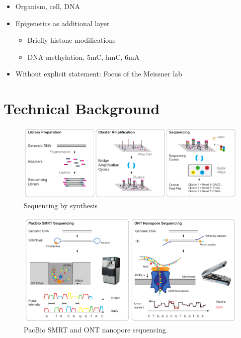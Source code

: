 \begin{itemize}
    \item Organism, cell, DNA
    \item Epigenetics as additional layer
    \begin{itemize}
        \item Briefly histone modifications
        \item DNA methylation, 5mC, hmC, 6mA
    \end{itemize}
    \item Without explicit statement: Focus of the Meissner lab
\end{itemize}


\section{Technical Background}
\label{sec:intro:sequencing}

\begin{figure}[h]
	\centering
	\includegraphics[width=1.0\textwidth]{figures/intro/sbs.pdf}
	\captionsetup{format=plain}
	\caption[Sequencing by synthesis]{Sequencing by synthesis}
	\label{fig:intro:sbs}
\end{figure}

\begin{figure}[h]
	\centering
	\includegraphics[width=1.0\textwidth]{figures/intro/long_read.pdf}
	\captionsetup{format=plain}
	\caption[Long read sequencing]{PacBio SMRT and ONT nanopore sequencing.}
	\label{fig:intro:longread}
\end{figure}


